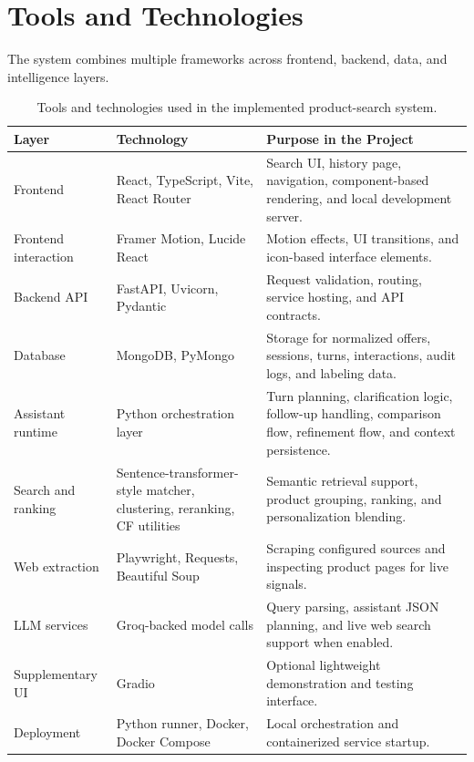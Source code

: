 \documentclass[12pt,a4paper,oneside]{report}
\begin{document}
\section{Tools and Technologies}
The system combines multiple frameworks across frontend, backend, data, and intelligence layers.

\begin{table}[H]
\centering
\small
\setlength{\tabcolsep}{4pt}
\renewcommand{\arraystretch}{1.08}
\caption{Tools and technologies used in the implemented product-search system.}
\label{tab:tools}
\begin{tabular}{|L{0.21\textwidth}|L{0.24\textwidth}|L{0.40\textwidth}|}
\hline
\textbf{Layer} & \textbf{Technology} & \textbf{Purpose in the Project} \\
\hline
Frontend & React, TypeScript, Vite, React Router & Search UI, history page, navigation, component-based rendering, and local development server. \\
\hline
Frontend interaction & Framer Motion, Lucide React & Motion effects, UI transitions, and icon-based interface elements. \\
\hline
Backend API & FastAPI, Uvicorn, Pydantic & Request validation, routing, service hosting, and API contracts. \\
\hline
Database & MongoDB, PyMongo & Storage for normalized offers, sessions, turns, interactions, audit logs, and labeling data. \\
\hline
Assistant runtime & Python orchestration layer & Turn planning, clarification logic, follow-up handling, comparison flow, refinement flow, and context persistence. \\
\hline
Search and ranking & Sentence-transformer-style matcher, clustering, reranking, CF utilities & Semantic retrieval support, product grouping, ranking, and personalization blending. \\
\hline
Web extraction & Playwright, Requests, Beautiful Soup & Scraping configured sources and inspecting product pages for live signals. \\
\hline
LLM services & Groq-backed model calls & Query parsing, assistant JSON planning, and live web search support when enabled. \\
\hline
Supplementary UI & Gradio & Optional lightweight demonstration and testing interface. \\
\hline
Deployment & Python runner, Docker, Docker Compose & Local orchestration and containerized service startup. \\
\hline
\end{tabular}
\end{table}
\end{document}
